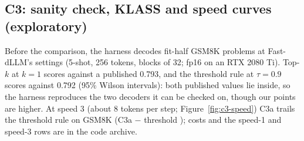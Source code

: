 
\subsection{C3: sanity check, KLASS and speed curves (exploratory)}
\label{sec:c3-app}

Before the comparison, the harness decodes  fit-half GSM8K
problems at Fast-dLLM's settings (5-shot, 256 tokens, blocks of 32; fp16 on an RTX 2080 Ti).
Top-$k$ at $k=1$ scores  against a published 0.793, and the
threshold rule at $\tau=0.9$ scores  against 0.792
\citep{wu2025fastdllm} (95\% Wilson intervals): both published values lie inside, so the
harness reproduces the two decoders it can be checked on, though our points are higher.
At speed 3 (about 8 tokens per step; Figure~\ref{fig:c3-speed}) C3a trails the threshold rule on
GSM8K (C3a $-$ threshold ); costs and the
speed-1 and speed-3 rows are in the code archive.

